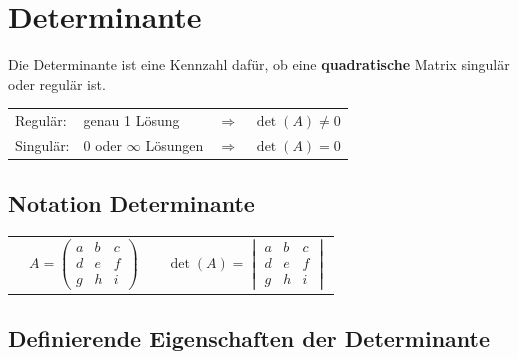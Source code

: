 \section{Determinante}
Die Determinante ist eine Kennzahl dafür, ob eine \textbf{quadratische} Matrix singulär oder regulär ist. 
\vspace{0.2cm}

\begin{tabular}{lll}
	Regulär: 	& genau 1 Lösung 			& $\Rightarrow \quad \det(A) \neq 0$ \\
	Singulär: 	& 0 oder $\infty$ Lösungen 	& $\Rightarrow \quad \det(A) = 0$ 	\\
\end{tabular}
		

\subsection{Notation Determinante}

\begin{tabular}{clcl}
	&$A =
	\begin{pmatrix}
		a & b & c \\
		d & e & f \\
		g & h & i 
	\end{pmatrix}$ &&
	$\det(A) = 
	\begin{vmatrix}
		a & b & c \\
		d & e & f \\
		g & h & i 
	\end{vmatrix}$ 
\end{tabular}


\subsection{Definierende Eigenschaften der Determinante}

